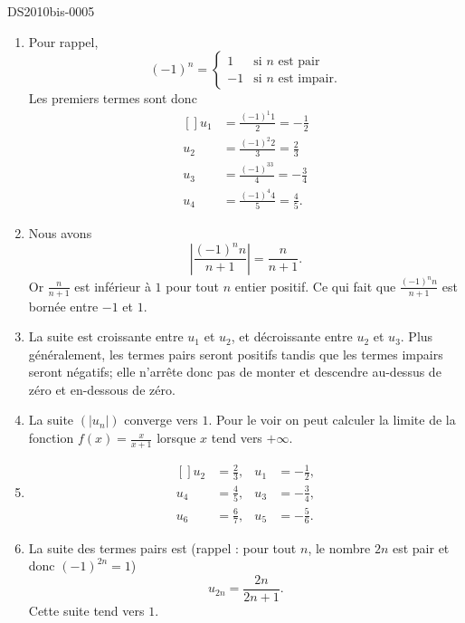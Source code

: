 
\begin{corrige}{DS2010bis-0005}


	\begin{enumerate}
		\item
			Pour rappel, 
			\begin{equation}
				(-1)^n=\begin{cases}
					1	&	\text{si $n$ est pair}\\
					-1	&	 \text{si $n$ est impair.}
				\end{cases}
			\end{equation}
			Les premiers termes sont donc
			\begin{equation}
				\begin{aligned}[]
					u_1&=\frac{(-1)^1 1 }{2}=-\frac{ 1 }{2}\\
					u_2&=\frac{(-1)^2 2 }{3}=\frac{ 2 }{ 3 }\\
					u_3&=\frac{(-1)^33}{ 4 }=-\frac{ 3 }{ 4 }\\
					u_4&=\frac{(-1)^4 4}{ 5 }=\frac{ 4 }{ 5 }.
				\end{aligned}
			\end{equation}
		\item
			Nous avons
			\begin{equation}
				\left| \frac{(-1)^nn}{ n+1 } \right|=\frac{n}{ n+1 }.
			\end{equation}
			Or $\frac{n}{ n+1 }$ est inférieur à $1$ pour tout $n$ entier positif. Ce qui fait que $\frac{(-1)^nn}{ n+1 }$ est bornée entre $-1$ et $1$. 
		\item
			La suite est croissante entre $u_1$ et $u_2$, et décroissante entre $u_2$ et $u_3$. Plus généralement, les termes pairs seront positifs tandis que les termes impairs seront négatifs; elle n'arrête donc pas de monter et descendre au-dessus de zéro et en-dessous de zéro.
		\item
			La suite $(| u_n |)$ converge vers $1$. Pour le voir on peut calculer la limite de la fonction $f(x)=\frac{x}{ x+1 }$ lorsque $x$ tend vers $+\infty$.  
		\item
			\begin{equation}
				\begin{aligned}[]
					u_2&=\frac{ 2 }{3},	&u_1&=-\frac{1}{2},\\
					u_4&=\frac{ 4 }{5},	&u_3&=-\frac{ 3 }{ 4 },\\
					u_6&=\frac{ 6 }{7},	&u_5&=-\frac{ 5 }{ 6 }.
				\end{aligned}
			\end{equation}
		\item
			La suite des termes pairs est (rappel : pour tout $n$, le nombre $2n$ est pair et donc $(-1)^{2n}=1$)
			\begin{equation}
				u_{2n}=\frac{2n}{ 2n+1 }.
			\end{equation}
			Cette suite tend vers $1$.


\end{enumerate}
\end{corrige}
